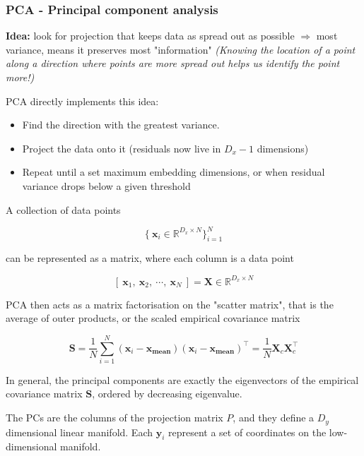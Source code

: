 \documentclass[11pt]{article}
\begin{document}
\subsubsection{PCA - Principal component analysis}

\textbf{Idea:} look for projection that keeps data as spread out as possible
$\Rightarrow$  most variance, means it preserves most "information" \emph{(Knowing the location of a point along a direction where points are more spread out helps us identify the point more!)}

\vspace{0.5cm}

\begin{tcolorbox}[title=PCA algorithm]

PCA directly implements this idea:

\begin{itemize}
	\item Find the direction with the greatest variance.
	\item Project the data onto it (residuals now live in $D_x - 1$ dimensions)
	\item Repeat until a set maximum embedding dimensions, or when residual variance drops below a given threshold
\end{itemize}

\end{tcolorbox}

A collection of data points 

$$\{\ \mathbf{x}_i \in \mathbb{R}^{D_x\times N} \}_{i=1}^N $$

can be represented as a matrix, where each column is a data point

$$ [\ \mathbf{x}_1,\  \mathbf{x}_2,\  \cdots,\  \mathbf{x}_N\ ] = \mathbf{X} \in \mathbb{R}^{D_x\times N}$$

PCA then acts as a matrix factorisation on the "scatter matrix", that is the average of outer products, or the scaled empirical covariance matrix

$$ \mathbf{S} = \frac{1}{N}\sum_{i=1}^N (\mathbf{x}_i - \mathbf{x_{\textrm{mean}}})(\mathbf{x}_i - \mathbf{x_{\textrm{mean}}})^\top = \frac{1}{N} \mathbf{X}_c\mathbf{X}_c^\top $$


 In general, the principal components are exactly the eigenvectors of the empirical covariance matrix $\mathbf{S}$, ordered by decreasing eigenvalue. 
 
 The PCs are the columns of the projection matrix $P$, and they define a $D_y$ dimensional linear manifold. Each $\mathbf{y}_i$ represent a set of coordinates on the low-dimensional manifold.
 
\end{document}
